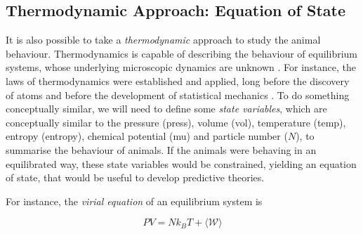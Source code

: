 \documentclass[11pt,twoside]{report}
\begin{document}
\subsection{Thermodynamic Approach: Equation of State}

It is also possible to take a \emph{thermodynamic} approach to study the animal behaviour. Thermodynamics is capable of describing the behaviour of equilibrium systems, whose underlying microscopic dynamics are unknown \cite{ouellette2022}.
For instance, the laws of thermodynamics were established and applied, long before the discovery of atoms and before the development of statistical mechanics \cite{sethna2006, ouellette2022}.
To do something conceptually similar, we will need to define some \emph{state variables}, which are conceptually similar to the pressure (\gls{press}), volume (\gls{vol}), temperature (\gls{temp}), entropy (\gls{entropy}), chemical potential (\gls{mu}) and particle number ($N$), to summarise the behaviour of animals.
If the animals were behaving in an equilibrated way, these state variables would be constrained, yielding an equation of state, that would be useful to develop predictive theories.

For instance, the \emph{virial equation} of an equilibrium system is

\begin{equation}
	 PV = Nk_BT + \langle \mathcal{W} \rangle
\label{eq:virial}
\end{equation}
\end{document}
